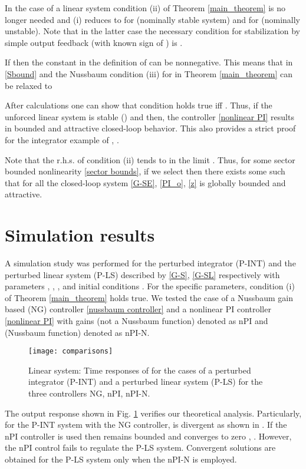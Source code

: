 \documentclass[preprint,12pt]{article}
\begin{document}
\begin{remark}
In the case of a linear system  condition (ii) of Theorem \ref{main_theorem} is no longer needed and  (i)  reduces to  for  (nominally stable system) and  for  (nominally unstable). Note that in the latter case the necessary condition for stabilization by simple output feedback (with known sign of ) is .
 \end{remark}
 \begin{remark}
 If  then the constant  in the definition of  can be nonnegative. This means that in \eqref{Sbound}   and the Nussbaum condition (iii) for  in Theorem \ref{main_theorem} can be relaxed to

After calculations one can show that condition  holds true iff .
Thus, if the unforced linear system is stable () and  then, the controller \eqref{nonlinear PI} results in bounded and attractive closed-loop behavior. This also provides a strict proof for the integrator example of \cite{Ortega_paper}, \cite{AKO_book}.
\end{remark}
\begin{remark}\label{remark_sector}
Note that the r.h.s. of condition (ii) tends to  in the limit . Thus,  for some sector bounded nonlinearity \eqref{sector bounds}, if we select  then there exists some  such that for all  the closed-loop system \eqref{G-SE}, \eqref{PI_o}, \eqref{z} is globally bounded and attractive.
\end{remark}
\section{Simulation results}
 \label{simulation}
A simulation study was performed for the perturbed integrator  (P-INT) and the perturbed linear system  (P-LS) described by  \eqref{G-S}, \eqref{G-SL} respectively with parameters , , ,  and initial conditions . For the specific parameters, condition (i) of Theorem \ref{main_theorem} holds true. We tested the case of a Nussbaum gain based (NG) controller \eqref{nussbaum controller} and a nonlinear PI controller \eqref{nonlinear PI} with gains   (not a Nussbaum function) denoted as nPI and  (Nussbaum function) denoted as nPI-N.
\begin{figure}[!t]
\centering
\texttt{[image: comparisons]}
\caption{Linear system: Time responses of   for the cases of a perturbed integrator (P-INT) and a perturbed linear system (P-LS) for the three controllers NG, nPI, nPI-N.}
\label{comparisons}
\end{figure}
The output response  shown in Fig. \ref{comparisons} verifies our theoretical analysis. Particularly, for the P-INT system with the NG controller,  is divergent as shown in \cite{GS}. If the nPI controller is used then  remains bounded and converges to zero \cite{Ortega_paper}, \cite{AKO_book}. However, the nPI control fails to regulate the P-LS system. Convergent solutions are obtained for the P-LS system only when the nPI-N is employed.
\end{document}
